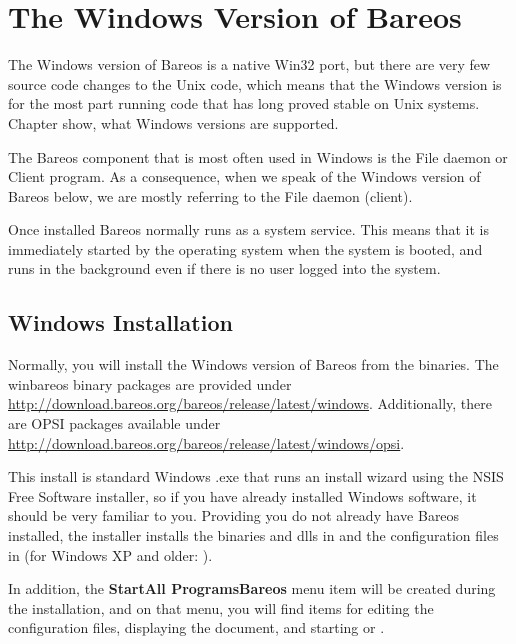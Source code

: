 
\chapter{The Windows Version of Bareos}
\label{Win32Chapter}
\label{sec:windows}

The Windows version of Bareos is a native Win32 port, but there
are very few source code changes to the Unix code, which means that the
Windows version is for the most part running code that has long proved
stable on Unix systems. Chapter  show, what Windows versions are supported.

The Bareos component that is most often used in Windows 
is the File daemon or Client program. 
As a consequence, when we
speak of the Windows version of Bareos below, we are mostly referring to
the File daemon (client).

Once installed Bareos normally runs as a system service. This means that it is
immediately started by the operating system when the system is booted, and
runs in the background even if there is no user logged into the system.

\section{Windows Installation}
\label{Windows:Installation}
\label{Windows:Configuration:Files}

Normally, you will install the Windows version of Bareos from the binaries.
The winbareos binary packages are provided under \url{http://download.bareos.org/bareos/release/latest/windows}.
Additionally, there are OPSI packages available under \url{http://download.bareos.org/bareos/release/latest/windows/opsi}.

This install is standard Windows .exe that runs an install wizard using the
NSIS Free Software installer, so if you have already installed Windows
software, it should be very familiar to you.
Providing you do not already
have Bareos installed, the installer installs the binaries and dlls in
 and the configuration files
in  (for Windows XP and older: ).

In addition, the {\bf Start\-{\textgreater}All Programs\-{\textgreater}Bareos} menu item
will be created during the installation, and on that menu, you
will find items for editing the configuration files, displaying
the document, and starting  or .


